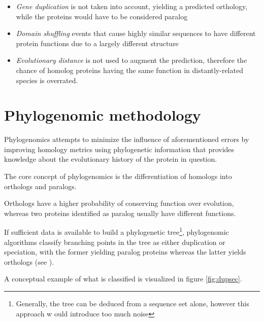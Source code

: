 \documentclass[pdftex,paper=A4,DIV=calc,titlepage,12pt]{scrartcl}
\newtheorem[L]{boxedDefinition}{Definition}
\begin{document}
\begin{itemize}
 \item \textit{Gene duplication} is not taken into account, yielding a predicted orthology, while the proteins would have to be considered paralog
 \item \textit{Domain shuffling} events that cause highly similar sequences to have different protein functions due to a largely different structure
 \item \textit{Evolutionary distance} is not used to augment the prediction, therefore the chance of homolog proteins having the same function in distantly-related species is overrated.
\end{itemize}

\section{Phylogenomic methodology}

Phylogenomics attempts to minimize the influence of aforementioned errors by improving homology metrics using phylogenetic information that provides knowledge about the evolutionary history of the protein in question.

The core concept of phylogenomics is the differentiation of homologs into orthologs and paralogs.

Orthologs have a higher probability of conserving function over evolution, whereas two proteins identified as paralog usually have different functions.

If sufficient data is available to build a phylogenetic tree\footnote{Generally, the tree can be deduced from a sequence set alone, however this approach w ould introduce too much noise}, phylogenomic algorithms classify branching points in the tree as either duplication  or speciation, with the former yielding paralog proteins whereas the latter yields orthologs (see \cite{eisen2003phylogenomics}).

A conceptual example of what is classified is visualized in figure \vref{fig:dupsec}.
\end{document}
